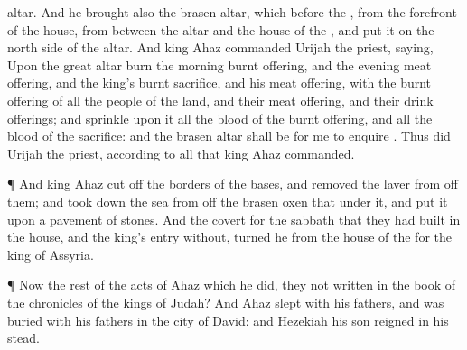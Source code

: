 {altar.
And he
brought also the
brasen
altar, which
{}
before the
{}, from the
forefront of the
house, from between the
altar and the
house of the
{}, and
put it on the
north
side of the
altar.
And
king
Ahaz
commanded
Urijah the
priest,
saying, Upon the
great
altar
burn the
morning burnt
offering, and the
evening meat
offering, and the
king’s burnt
sacrifice, and his meat
offering, with the burnt
offering of all the
people of the
land, and their meat
offering, and their drink
offerings; and
sprinkle upon it all the
blood of the burnt
offering, and all the
blood of the
sacrifice: and the
brasen
altar shall be for me to
enquire
{}.
Thus
did
Urijah the
priest, according to all that
king
Ahaz
commanded.
\par }{\PP {}¶ And
king
Ahaz cut
off the
borders of the
bases, and
removed the
laver from off them; and took
down the
sea from off the
brasen
oxen that
{} under it, and
put it upon a
pavement of
stones.
And the
covert for the
sabbath that they had
built in the
house, and the
king’s
entry
without,
turned he from the
house of the
{}
for the
king of
Assyria.
\par }{\PP {}¶ Now the
rest of the
acts of
Ahaz which he
did,
{} they not
written in the
book of the
chronicles of the
kings of
Judah?
And
Ahaz
slept with his
fathers, and was
buried with his
fathers in the
city of
David: and
Hezekiah his
son
reigned in his stead.

}
